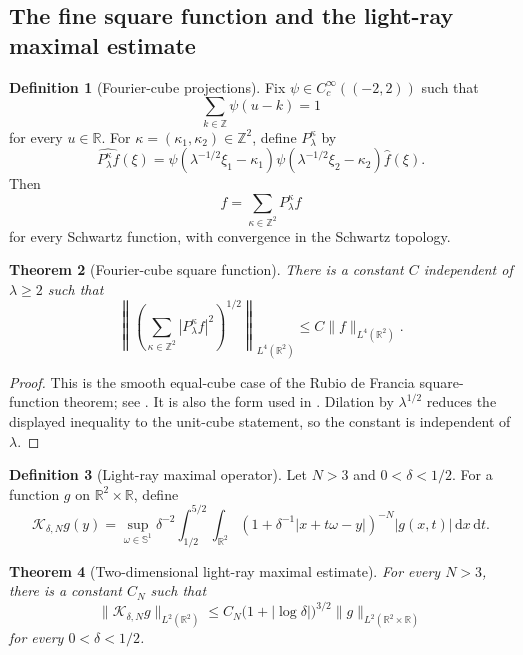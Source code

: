 \documentclass[11pt]{article}
\numberwithin{equation}{section}
\newtheorem{theorem}{Theorem}[section]
\theoremstyle{definition}
\newtheorem{definition}[theorem]{Definition}
\theoremstyle{remark}
\newcommand{\R}{\mathbb R}
\newcommand{\Z}{\mathbb Z}
\newcommand{\Sph}{\mathbb S}
\newcommand{\dd}{\,\mathrm d}
\begin{document}
\subsection{The fine square function and the light-ray maximal estimate}

\begin{definition}[Fourier-cube projections]\label{def:fourier-cubes}
Fix $\psi\in C_c^\infty((-2,2))$ such that
\[
\sum_{k\in\Z}\psi(u-k)=1
\]
for every $u\in\R$.  For $\kappa=(\kappa_1,\kappa_2)\in\Z^2$, define $P_\lambda^\kappa$ by
\[
\widehat{P_\lambda^\kappa f}(\xi)=
\psi(\lambda^{-1/2}\xi_1-\kappa_1)
\psi(\lambda^{-1/2}\xi_2-\kappa_2)\widehat f(\xi).
\]
Then
\[
f=\sum_{\kappa\in\Z^2}P_\lambda^\kappa f
\]
for every Schwartz function, with convergence in the Schwartz topology.
\end{definition}

\begin{theorem}[Fourier-cube square function]\label{thm:fourier-cube-square-function}
There is a constant $C$ independent of $\lambda\ge2$ such that
\[
\left\|\left(\sum_{\kappa\in\Z^2}|P_\lambda^\kappa f|^2\right)^{1/2}\right\|_{L^4(\R^2)}
\le C\|f\|_{L^4(\R^2)}.
\]
\end{theorem}

\begin{proof}
This is the smooth equal-cube case of the Rubio de Francia square-function theorem; see \cite[Chapter~IV]{GarciaRubio1985}.  It is also the form used in \cite[Equation~(1.10)]{MSS1992}.  Dilation by $\lambda^{1/2}$ reduces the displayed inequality to the unit-cube statement, so the constant is independent of $\lambda$.
\end{proof}

\begin{definition}[Light-ray maximal operator]\label{def:light-ray-maximal}
Let $N>3$ and $0<\delta<1/2$.  For a function $g$ on $\R^2\times\R$, define
\[
\mathcal K_{\delta,N}g(y)
=\sup_{\omega\in\Sph^1}
\delta^{-2}\int_{1/2}^{5/2}\int_{\R^2}
(1+\delta^{-1}|x+t\omega-y|)^{-N}|g(x,t)|\dd x\dd t.
\]
\end{definition}

\begin{theorem}[Two-dimensional light-ray maximal estimate]\label{thm:mss-kakeya}
For every $N>3$, there is a constant $C_N$ such that
\[
\|\mathcal K_{\delta,N}g\|_{L^2(\R^2)}
\le C_N\bigl(1+|\log\delta|\bigr)^{3/2}
\|g\|_{L^2(\R^2\times\R)}
\]
for every $0<\delta<1/2$.
\end{theorem}
\end{document}
